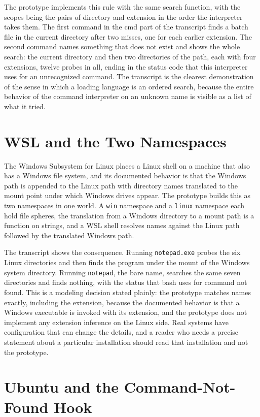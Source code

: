 \documentclass[11pt,oneside]{report}
\theoremstyle{plain}
\theoremstyle{definition}
\theoremstyle{remark}
\begin{document}
The prototype implements this rule with the same search function, with the scopes being the pairs of directory and extension in the order the interpreter takes them. The first command in the cmd part of the transcript finds a batch file in the current directory after two misses, one for each earlier extension. The second command names something that does not exist and shows the whole search: the current directory and then two directories of the path, each with four extensions, twelve probes in all, ending in the status code that this interpreter uses for an unrecognized command. The transcript is the clearest demonstration of the sense in which a loading language is an ordered search, because the entire behavior of the command interpreter on an unknown name is visible as a list of what it tried.

\section{WSL and the Two Namespaces}

The Windows Subsystem for Linux places a Linux shell on a machine that also has a Windows file system, and its documented behavior is that the Windows path is appended to the Linux path with directory names translated to the mount point under which Windows drives appear. The prototype builds this as two namespaces in one world. A \texttt{win} namespace and a \texttt{linux} namespace each hold file spheres, the translation from a Windows directory to a mount path is a function on strings, and a WSL shell resolves names against the Linux path followed by the translated Windows path.

The transcript shows the consequence. Running \texttt{notepad.exe} probes the six Linux directories and then finds the program under the mount of the Windows system directory. Running \texttt{notepad}, the bare name, searches the same seven directories and finds nothing, with the status that bash uses for command not found. This is a modeling decision stated plainly: the prototype matches names exactly, including the extension, because the documented behavior is that a Windows executable is invoked with its extension, and the prototype does not implement any extension inference on the Linux side. Real systems have configuration that can change the details, and a reader who needs a precise statement about a particular installation should read that installation and not the prototype.

\section{Ubuntu and the Command-Not-Found Hook}
\end{document}
